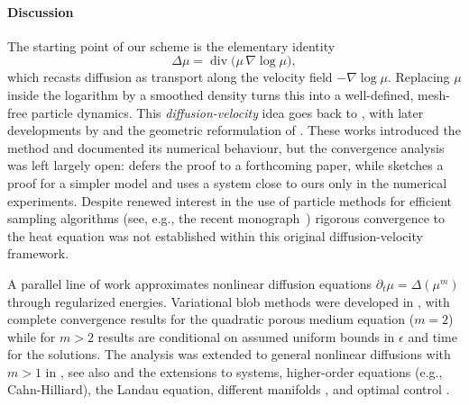 \documentclass[11pt]{article}
\theoremstyle{definition}
\newcommand{\divg}{\operatorname{div}}
\begin{document}
\paragraph{Discussion}
The starting point of our scheme is the elementary identity
\[
\Delta\mu=\divg\bigl(\mu\,\nabla\log\mu\bigr),
\]
which recasts diffusion as transport along the velocity field
\(-\nabla\log\mu\). Replacing \(\mu\) inside the logarithm by a smoothed density
turns this into a well-defined, mesh-free particle dynamics. This
\emph{diffusion-velocity} idea goes back to
\cite{degond1990deterministic}, with later developments by
\cite{lions2001methode,lacombe1999analyse,lacombe1999presentation,
mas2002diffusion} and the geometric reformulation of
\cite{brenier2017geometric}. These works introduced the method and documented
its numerical behaviour, but the convergence analysis was left largely open:
\cite{degond1990deterministic} defers the proof to a forthcoming paper, while
\cite{lions2001methode} sketches a proof for a simpler model and uses a system
close to ours only in the numerical experiments. Despite renewed interest in the use of particle methods for efficient sampling algorithms (see, e.g., the recent monograph~\cite{Che26}) rigorous
convergence to the heat equation was not established within this original
diffusion-velocity framework.

A parallel line of work approximates nonlinear diffusion equations
\(\partial_t\mu=\Delta(\mu^m)\) through regularized energies. Variational blob
methods were developed in \cite{craig2016blob,carrillo2019blob}, with complete
convergence results for the quadratic porous medium equation (\(m=2\)) while for \(m>2\) results are conditional  on assumed uniform bounds in $\epsilon$ and time for the solutions. The analysis was extended to general nonlinear diffusions
with \(m>1\) in \cite{burger2023porous,carrillo2023nonlocal}, see also
\cite{craig2023blob,daneri2022deterministic,
di2025approximation, amassad2025deterministic} and the extensions to
systems, higher-order equations (e.g., Cahn-Hilliard), the Landau equation, different manifolds \cite{peletier2025nonlinear}, and optimal control
\cite{doumic2024multispecies,elbar2024limit,carrillo2020particle,carrillo2024landau,craig2025blob}.
\end{document}
